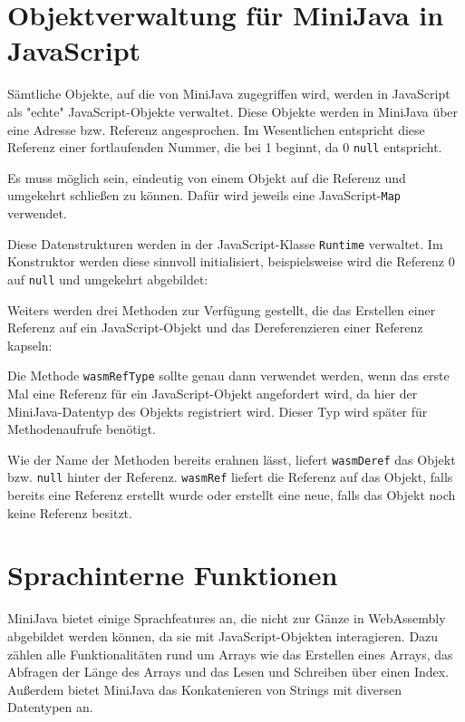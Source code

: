 \section{Objektverwaltung für MiniJava in JavaScript}

Sämtliche Objekte, auf die von MiniJava zugegriffen wird, werden in JavaScript als "echte" JavaScript-Objekte verwaltet. Diese Objekte werden in MiniJava über eine Adresse bzw. Referenz angesprochen. Im Wesentlichen entspricht diese Referenz einer fortlaufenden Nummer, die bei 1 beginnt, da 0 \lstinline{null} entspricht.

Es muss möglich sein, eindeutig von einem Objekt auf die Referenz und umgekehrt schließen zu können. Dafür wird jeweils eine JavaScript-\lstinline{Map} verwendet.

Diese Datenstrukturen werden in der JavaScript-Klasse \lstinline{Runtime} verwaltet. Im Konstruktor werden diese sinnvoll initialisiert, beispielsweise wird die Referenz 0 auf \lstinline{null} und umgekehrt abgebildet:



Weiters werden drei Methoden zur Verfügung gestellt, die das Erstellen einer Referenz auf ein JavaScript-Objekt und das Dereferenzieren einer Referenz kapseln:



Die Methode \lstinline{wasmRefType} sollte genau dann verwendet werden, wenn das erste Mal eine Referenz für ein JavaScript-Objekt angefordert wird, da hier der MiniJava-Datentyp des Objekts registriert wird. Dieser Typ wird später für Methodenaufrufe benötigt.

Wie der Name der Methoden bereits erahnen lässt, liefert \lstinline{wasmDeref} das Objekt bzw. \lstinline{null} hinter der Referenz. \lstinline{wasmRef} liefert die Referenz auf das Objekt, falls bereits eine Referenz erstellt wurde oder erstellt eine neue, falls das Objekt noch keine Referenz besitzt.

\section{Sprachinterne Funktionen}

MiniJava bietet einige Sprachfeatures an, die nicht zur Gänze in WebAssembly abgebildet werden können, da sie mit JavaScript-Objekten interagieren. Dazu zählen alle Funktionalitäten rund um Arrays wie das Erstellen eines Arrays, das Abfragen der Länge des Arrays und das Lesen und Schreiben über einen Index. Außerdem bietet MiniJava das Konkatenieren von Strings mit diversen Datentypen an.

